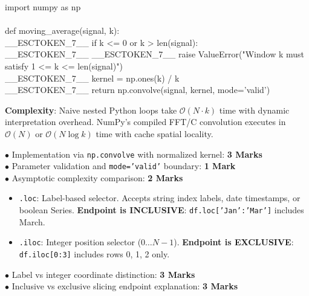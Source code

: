 \begin{solutionbox}
\begin{pycode}
import numpy as np\\
~\\
def moving\_average(signal, k):\\
\_\_ESCTOKEN\_7\_\_ if k <= 0 or k > len(signal):\\
\_\_ESCTOKEN\_7\_\_ \_\_ESCTOKEN\_7\_\_ raise ValueError("Window k must satisfy 1 <= k <= len(signal)")\\
\_\_ESCTOKEN\_7\_\_ kernel = np.ones(k) / k\\
\_\_ESCTOKEN\_7\_\_ return np.convolve(signal, kernel, mode='valid')
\end{pycode}
\textbf{Complexity}: Naive nested Python loops take $\mathcal{O}(N \cdot k)$ time with dynamic interpretation overhead. NumPy's compiled FFT/C convolution executes in $\mathcal{O}(N)$ or $\mathcal{O}(N \log k)$ time with cache spatial locality.
\begin{markingrubric}
$\bullet$ Implementation via \texttt{np.convolve} with normalized kernel: \textbf{3 Marks}\\
$\bullet$ Parameter validation and \texttt{mode='valid'} boundary: \textbf{1 Mark}\\
$\bullet$ Asymptotic complexity comparison: \textbf{2 Marks}
\end{markingrubric}
\end{solutionbox}

\begin{solutionbox}
\begin{itemize}[leftmargin=1.5em]
    \item \texttt{.loc}: Label-based selector. Accepts string index labels, date timestamps, or boolean Series. \textbf{Endpoint is INCLUSIVE}: \texttt{df.loc['Jan':'Mar']} includes March.
    \item \texttt{.iloc}: Integer position selector ($0 \dots N-1$). \textbf{Endpoint is EXCLUSIVE}: \texttt{df.iloc[0:3]} includes rows 0, 1, 2 only.
\end{itemize}
\begin{markingrubric}
$\bullet$ Label vs integer coordinate distinction: \textbf{3 Marks}\\
$\bullet$ Inclusive vs exclusive slicing endpoint explanation: \textbf{3 Marks}
\end{markingrubric}
\end{solutionbox}

